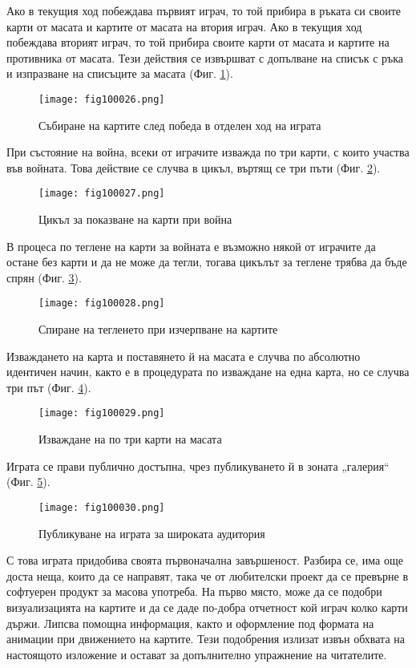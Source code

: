 Ако в текущия ход побеждава първият играч, то той прибира в ръката си своите карти от масата и картите от масата на втория играч. Ако в текущия ход побеждава вторият играч, то той прибира своите карти от масата и картите на противника от масата. Тези действия се извършват с допълване на списък с ръка и изпразване на списъците за масата (Фиг. \ref{fig100026}).

\begin{figure}[H]
  \centering
  \texttt{[image: fig100026.png]}
  \caption{Събиране на картите след победа в отделен ход на играта}
\label{fig100026}
\end{figure}

При състояние на война, всеки от играчите изважда по три карти, с които участва във войната. Това действие се случва в цикъл, въртящ се три пъти (Фиг. \ref{fig100027}).

\begin{figure}[H]
  \centering
  \texttt{[image: fig100027.png]}
  \caption{Цикъл за показване на карти при война}
\label{fig100027}
\end{figure}

В процеса по теглене на карти за войната е възможно някой от играчите да остане без карти и да не може да тегли, тогава цикълът за теглене трябва да бъде спрян (Фиг. \ref{fig100028}).

\begin{figure}[H]
  \centering
  \texttt{[image: fig100028.png]}
  \caption{Спиране на тегленето при изчерпване на картите}
\label{fig100028}
\end{figure}

Изваждането на карта и поставянето й на масата е случва по абсолютно идентичен начин, както е в процедурата по изваждане на една карта, но се случва три път (Фиг. \ref{fig100029}).

\begin{figure}[H]
  \centering
  \texttt{[image: fig100029.png]}
  \caption{Изваждане на по три карти на масата}
\label{fig100029}
\end{figure}

Играта се прави публично достъпна, чрез публикуването й в зоната „галерия“ (Фиг. \ref{fig100030}).

\begin{figure}[H]
  \centering
  \texttt{[image: fig100030.png]}
  \caption{Публикуване на играта за широката аудитория}
\label{fig100030}
\end{figure}

С това играта придобива своята първоначална завършеност. Разбира се, има още доста неща, които да се направят, така че от любителски проект да се превърне в софтуерен продукт за масова употреба. На първо място, може да се подобри визуализацията на картите и да се даде по-добра отчетност кой играч колко карти държи. Липсва помощна информация, както и оформление под формата на анимации при движението на картите. Тези подобрения излизат извън обхвата на настоящото изложение и остават за допълнително упражнение на читателите. 

